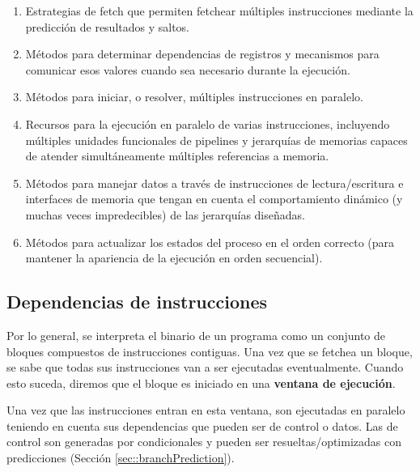 \begin{enumerate}
	\item Estrategias de fetch que permiten fetchear múltiples instrucciones mediante la predicción de resultados y saltos.
	\item Métodos para determinar dependencias de registros y mecanismos para comunicar esos valores cuando sea necesario durante la ejecución.
	\item Métodos para iniciar, o resolver, múltiples instrucciones en paralelo.
	\item Recursos para la ejecución en paralelo de varias instrucciones, incluyendo múltiples unidades funcionales de pipelines y jerarquías de memorias capaces de atender simultáneamente múltiples referencias a memoria.
	\item Métodos para manejar datos a través de instrucciones de lectura/escritura e interfaces de memoria que tengan en cuenta el comportamiento dinámico (y muchas veces impredecibles) de las jerarquías diseñadas.
	\item Métodos para actualizar los estados del proceso en el orden correcto (para mantener la apariencia de la ejecución en orden secuencial).
\end{enumerate}

\subsection{Dependencias de instrucciones}\label{sec:instructionLevelParalelism:dependenciaDeInstrucciones}
Por lo general, se interpreta el binario de un programa como un conjunto de bloques compuestos de instrucciones contiguas. Una vez que se fetchea un bloque, se sabe que todas sus instrucciones van a ser ejecutadas eventualmente. Cuando esto suceda, diremos que el bloque es iniciado en una \textbf{ventana de ejecución}.

Una vez que las instrucciones entran en esta ventana, son ejecutadas en paralelo teniendo en cuenta sus dependencias que pueden ser de control o datos. Las de control son generadas por condicionales y pueden ser resueltas/optimizadas con predicciones (Sección \ref{sec::branchPrediction}). 

